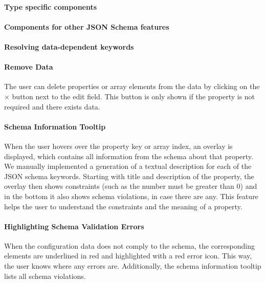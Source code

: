 \paragraph{Type specific components}


\paragraph{Components for other JSON Schema features}



\paragraph{Resolving data-dependent keywords}


\paragraph{Remove Data}
The user can delete properties or array elements from the data by clicking on the $\times$ button next to the edit field.
This button is only shown if the property is not required and there exists data.

\paragraph{Schema Information Tooltip}
When the user hovers over the property key or array index, an overlay is displayed, which contains all information from the schema about that property.
We manually implemented a generation of a textual description for each of the JSON schema keywords.
Starting with title and description of the property, the overlay then shows constraints (such as the number must be greater than 0) and in the bottom it also shows schema violations, in case there are any.
This feature helps the user to understand the constraints and the meaning of a property.


\paragraph{Highlighting Schema Validation Errors}
When the configuration data does not comply to the schema, the corresponding elements are underlined in red and highlighted with a red error icon.
This way, the user knows where any errors are.
Additionally, the schema information tooltip lists all schema violations.

